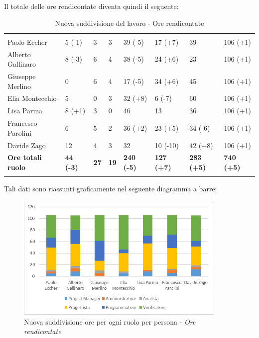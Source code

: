 Il totale delle ore rendicontate diventa quindi il seguente:
			\begin{table}[H]
	\centering
	\begin{tabular}{|C{4cm}|C{0.8cm}|C{0.8cm}|C{0.8cm}|C{0.8cm}|C{0.8cm}|C{0.8cm}|C{3cm}|}
		 & & &&&&&\\
		Paolo Eccher       & 5 (-1) & 3 & 3 & 39 (-5) & 17 (+7) & 39 & 106 (+1) \\
		\hline
		Alberto Gallinaro  & 8 (-3) & 6 & 4 & 38 (-5) & 24 (+6) & 23 & 106 (+1) \\
		\hline
		Giuseppe Merlino   & 0 & 6 & 4 & 17 (-5) & 34 (+6) & 45 & 106 (+1) \\
		\hline
		Elia Montecchio    & 5 & 0 & 3 & 32 (+8) & 6 (-7) & 60 & 106 (+1) \\
		\hline
		Lisa Parma         & 8 (+1) & 3 & 0 & 46 & 13 & 36 & 106 (+1) \\
		\hline
		Francesco Parolini& 6 & 5 & 2 & 36 (+2) & 23 (+5) & 34 (-6) & 106 (+1) \\
		\hline
		Davide Zago        & 12 & 4 & 3 & 32 & 10 (-10) & 42 (+8) & 106 (+1) \\
		\hline
		\textbf{Ore totali ruolo}  & \textbf{44 (-3)} & \textbf{27} & \textbf{19} & \textbf{240 (-5)} & \textbf{127 (+7)} & \textbf{283 (+5)} & \textbf{740 (+5)} \\
	\end{tabular}
	\caption{Nuova suddivisione del lavoro - Ore rendicontate }
\end{table}

Tali dati sono riassunti graficamente nel seguente diagramma a barre:
\begin{figure}[H] 
	\centering 
	\includegraphics[width=0.9\textwidth]{images/BarreSoloRendicontatoNuovo.png} 
	\caption{Nuova suddivisione ore per ogni ruolo per persona - \textit{Ore rendicontate}}
	\label{BarreRendicontate}
\end{figure}

